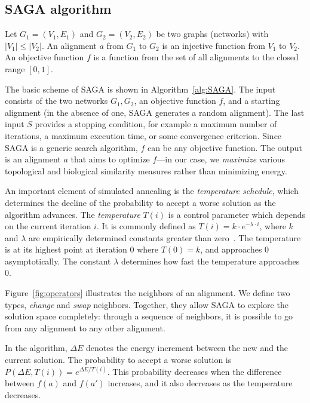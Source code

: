 \documentclass{bioinfo}
\begin{document}
\begin{methods}
\subsection{SAGA algorithm}
Let $G_1=(V_1,E_1)$ and $G_2=(V_2,E_2)$ be two graphs (networks) with $|V_1|\leq|V_2|$. An alignment $a$ from $G_1$ to $G_2$ is an injective function from $V_1$ to $V_2$. An objective function $f$ is a function from the set of all alignments to the closed range $[0,1]$.

The basic scheme of SAGA is shown in Algorithm~\ref{alg:SAGA}. The input consists of the two networks $G_1,G_2$, an objective function $f$, and a starting alignment (in the absence of one, SAGA generates a random alignment). The last input $S$ provides a stopping condition, for example a maximum number of iterations, a maximum execution time, or some convergence criterion. Since SAGA is a generic search algorithm, $f$ can be any objective function. The output is an alignment $a$ that aims to optimize $f$---in our case, we {\it maximize} various topological and biological similarity measures rather than minimizing energy.

An important element of simulated annealing is the \textit{temperature schedule}, which determines the decline of the probability to accept a worse solution as the algorithm advances. The \textit{temperature} $T(i)$ is a control parameter which depends on the current iteration $i$. It is commonly defined as $T(i)=k\cdot e^{-\lambda\cdot i}$, where $k$ and $\lambda$ are empirically determined constants greater than zero~\citep{SA1}. The temperature is at its highest point at iteration 0 where $T(0)=k$, and approaches 0 asymptotically. The constant $\lambda$ determines how fast the temperature approaches 0.

Figure~\ref{fig:operators} illustrates the neighbors of an alignment. We define two types, \textit{change} and \textit{swap} neighbors. Together, they allow SAGA to explore the solution space completely: through a sequence of neighbors, it is possible to go from any alignment to any other alignment. %

In the algorithm, $\Delta E$ denotes the energy increment between the new and the current solution. The probability to accept a worse solution is $P(\Delta E, T(i)) = e^{\Delta E/T(i)}$. This probability decreases when the difference between $f(a)$ and $f(a')$ increases, and it also decreases as the temperature decreases.


\end{methods}
\end{document}
